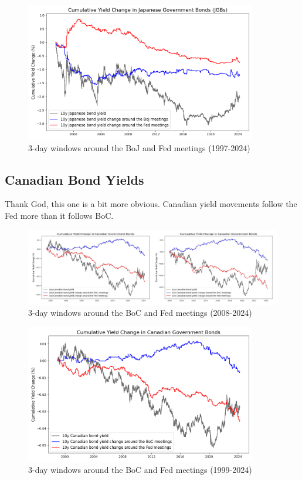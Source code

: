 \begin{figure}[!htbp]
    \centering
    \includegraphics[width=0.9\textwidth]{figures/1997_japanese_bonds_figure1a.png}
    \caption{3-day windows around the BoJ and Fed meetings (1997-2024)}
    \label{fig:boj1997}
\end{figure}


\subsection{Canadian Bond Yields}

Thank God, this one is a bit more obvious. Canadian yield movements follow the Fed more than it follows BoC.

\begin{figure}[!htbp]
    \centering
    \includegraphics[width=\textwidth]{figures/canadian_spot.jpg}
    \caption{3-day windows around the BoC and Fed meetings (2008-2024)}
    \label{fig:canada2008}
\end{figure}


\begin{figure}[!htbp]
    \centering
    \includegraphics[width=0.9\textwidth]{figures/1999_canadian_bond_figure1a.png}
    \caption{3-day windows around the BoC and Fed meetings (1999-2024)}
    \label{fig:boc1999}
\end{figure}

